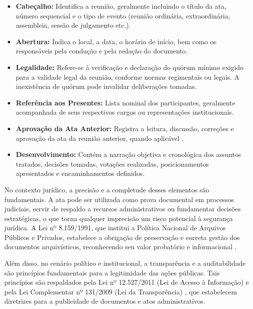 \begin{itemize}
    \item \textbf{Cabeçalho:} Identifica a reunião, geralmente incluindo o título da ata, número sequencial e o tipo de evento (reunião ordinária, extraordinária, assembleia, sessão de julgamento etc.).
    
    \item \textbf{Abertura:} Indica o local, a data, o horário de início, bem como os responsáveis pela condução e pela redação do documento.
    
    \item \textbf{Legalidade:} Refere-se à verificação e declaração do quórum mínimo exigido para a validade legal da reunião, conforme normas regimentais ou legais. A inexistência de quórum pode invalidar deliberações tomadas.
    
    \item \textbf{Referência aos Presentes:} Lista nominal dos participantes, geralmente acompanhada de seus respectivos cargos ou representações institucionais.
    
    \item \textbf{Aprovação da Ata Anterior:} Registra a leitura, discussão, correções e aprovação da ata da reunião anterior, quando aplicável \cite{republica_manual_2018}.
    
    \item \textbf{Desenvolvimento:} Contém a narração objetiva e cronológica dos assuntos tratados, decisões tomadas, votações realizadas, posicionamentos apresentados e encaminhamentos definidos.
\end{itemize}

No contexto jurídico, a precisão e a completude desses elementos são fundamentais. A ata pode ser utilizada como prova documental em processos judiciais, servir de respaldo a recursos administrativos ou fundamentar decisões estratégicas, o que torna qualquer imprecisão um risco potencial à segurança jurídica. A Lei nº 8.159/1991, que institui a Política Nacional de Arquivos Públicos e Privados, estabelece a obrigação de preservação e correta gestão dos documentos arquivísticos, reconhecendo seu valor probatório e informacional \cite{brasil_lei_1991}.

Além disso, no cenário político e institucional, a transparência e a auditabilidade são princípios fundamentais para a legitimidade das ações públicas. Tais princípios são respaldados pela Lei nº 12.527/2011 (Lei de Acesso à Informação) \cite{brasil_lei_2011} e pela Lei Complementar nº 131/2009 (Lei da Transparência) \cite{brasil_lei_2009}, que estabelecem diretrizes para a publicidade de documentos e atos administrativos.

